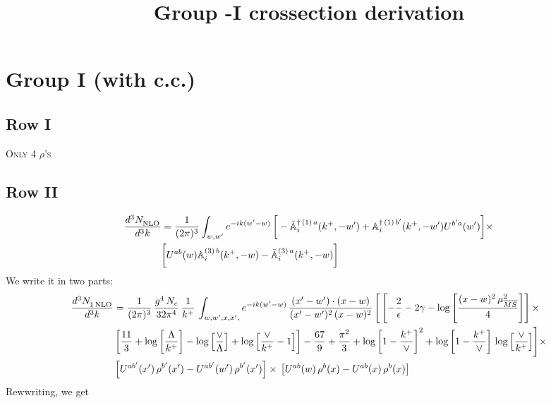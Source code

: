 \documentclass[9pt]{article}
\title{Group -I crossection derivation}
\author{}
\date{}
\def\mf#1{\mathbb{#1}}
\numberwithin{equation}{section}
\begin{document}
\maketitle
\section{Group I (with c.c.)}
\subsection{Row I\,}
\textsc{Only 4 $\rho$'s}
\subsection{Row II}
\begin{align}
    \frac{d^{3}N_{\rm NLO}^{\rm}}{d^{3}k} &  = \frac{1}{(2\pi)^{3}}  \int_{w, w^\prime} e^{-ik(w^\prime-w)}\,\bigg[-\bar{\mf{A}}^{\dagger\,(1)\,a}_{i}(k^{+},-w^{\prime})+\mf{A}^{\dagger\, (1)\, b^{\prime}}_{i}(k^{+},-w^{\prime})U^{b^{\prime}a}(w^{\prime})\bigg]\times \notag \\ & \bigg[U^{ab}(w)\mf{A}^{(3)\, b}_{i}(k^{+},- w)-\Bar{\mf{A}}^{(3)\, a}_{i}(k^{+}, - w)\bigg]\nonumber
\end{align}
We write it in two parts: 
\begin{align}
     \frac{d^{3}N_{1\,\rm NLO}^{\rm}}{d^{3}k} &  = \frac{1}{(2\pi)^{3}}\, \frac{g^{4}\,N_{c}}{32\pi^{4}}\,\frac{1}{k^{+}}\, \int_{w, w',x,x',} e^{-ik(w^\prime-w)}\, \frac{(x'-w')\cdot (x-w)}{(x'-w')^{2}\, (x-w)^{2}}\, \Bigg[\left[-\frac{2}{\epsilon}-2\gamma-\log{\left[\frac{(x-w)^{2}\,\mu^{2}_{\overline{MS}}}{4}\right]}\right]\times \notag \\ & \left[\frac{11}{3}+\log{\left[\frac{\Lambda}{k^{+}}\right]}-\log{\left[\frac{\vee}{\Lambda}\right]}+\log{\left[\frac{\vee}{k^{+}}-1\right]}\right]-\frac{67}{9}+\frac{\pi^{2}}{3}+\log{\left[1-\frac{k^{+}}{\vee}\right]^{2}}+\log{\left[1-\frac{k^{+}}{\vee}\right]}\,\log{\left[\frac{\vee}{k^{+}}\right]}\Bigg]\times\notag \\ & \left[U^{ab'}(x')\,\rho^{b'}(x') - U^{ab'}(w')\,\rho^{b'}(x')\right]\times\,\left[U^{ab}(w)\,\rho^{b}(x) - U^{ab}(x)\,\rho^{b}(x)\right]
\end{align}
Rewwriting, we get
\end{document}

